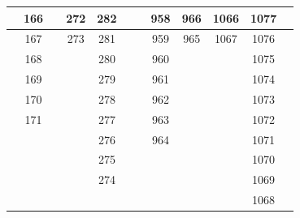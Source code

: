 \begin{table}
\begin{center}
{\begin{tabular} {| c | c | c | c | c | c | c | c | c | c | c | c | }
                         & 166                      &      & 272 & 282                      &                          &     & 958                      &  966                      & 1066 & 1077                       &                           \\ \hline
                         & 167                      &      & 273 & 281                      &                          &     & 959                      &  965                      & 1067 & 1076                       &                           \\ \hline
                         & 168                      &      &     & 280                      &                          &     & 960                      &                           &      & 1075                       &                           \\ \hline
                         & 169                      &      &     & 279                      &                          &     & 961                      &                           &      & 1074                       &                           \\ \hline
                         & 170                      &      &     & 278                      &                          &     & 962                      &                           &      & 1073                       &                           \\ \hline
                         & 171                      &      &     & 277                      &                          &     & 963                      &                           &      & 1072                       &                           \\ \hline
						 &                          &      &     & 276                      &                          &     & 964                      &                           &      & 1071                       &                           \\ \hline
						 &                          &      &     & 275                      &                          &     &                          &                           &      & 1070                       &                           \\ \hline
            			 &                          &      &     & 274                      &                          &     &                          &                           &      & 1069                       &                           \\ \hline
						 &                          &      &     &                          &                          &     &                          &                           &      & 1068                       &                           \\ \hline
 

\end{tabular}}
\end{center}
\end{table}
